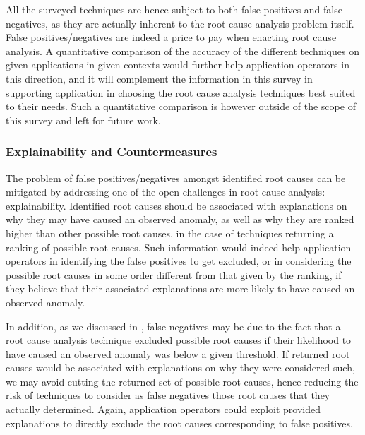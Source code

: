 All the surveyed techniques are hence subject to both false positives and false negatives, as they are actually inherent to the root cause analysis problem itself.
False positives/negatives are indeed a price to pay when enacting root cause analysis.
A quantitative comparison of the accuracy of the different techniques on given applications in given contexts would further help application operators in this direction, and it will complement the information in this survey in supporting application in choosing the root cause analysis techniques best suited to their needs.
Such a quantitative comparison is however outside of the scope of this survey and left for future work.

\subsubsection{Explainability and Countermeasures}
\label{sec:rca:discussion:explainability-countermeasures}
The problem of false positives/negatives amongst identified root causes can be mitigated by addressing one of the open challenges in root cause analysis: explainability.
Identified root causes should be associated with explanations on why they may have caused an observed anomaly, as well as why they are ranked higher than other possible root causes, in the case of techniques returning a ranking of possible root causes. 
Such information would indeed help application operators in identifying the false positives to get excluded, or in considering the possible root causes in some order different from that given by the ranking, if they believe that their associated explanations are more likely to have caused an observed anomaly.

In addition, as we discussed in , false negatives may be due to the fact that a root cause analysis technique excluded possible root causes if their likelihood to have caused an observed anomaly was below a given threshold.
If returned root causes would be associated with explanations on why they were considered such, we may avoid cutting the returned set of possible root causes, hence reducing the risk of techniques to consider as false negatives those root causes that they actually determined.
Again, application operators could exploit provided explanations to directly exclude the root causes corresponding to false positives.

